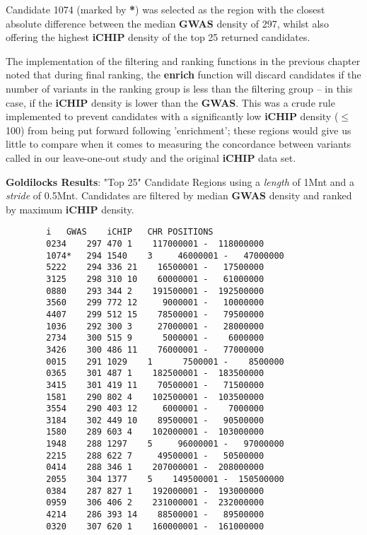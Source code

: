 Candidate 1074 (marked by \textbf{*}) was selected as the region with the
closest absolute difference between the median \textbf{GWAS} density of 297,
whilst also offering the highest \textbf{iCHIP} density of the top 25 returned
candidates.


The implementation of the filtering and ranking functions in the previous
chapter noted that during final ranking, the \textbf{enrich} function will
discard candidates if the number of variants in the ranking group is less than
the filtering group -- in this case, if the \textbf{iCHIP} density is lower than
the \textbf{GWAS}. This was a crude rule implemented to prevent candidates with
a significantly low \textbf{iCHIP} density ($\le$100) from being put forward following
'enrichment'; these regions would give us little to compare when it comes to
measuring the concordance between variants called in our leave-one-out study and
the original \textbf{iCHIP} data set.


\begin{listing}[H]
    \caption[resultsp2]{\textbf{Goldilocks Results}: "Top 25" Candidate Regions
    using a \textit{length} of 1Mnt and a \textit{stride} of 0.5Mnt. Candidates
    are filtered by median \textbf{GWAS} density and ranked by maximum
    \textbf{iCHIP} density.}
    \label{list:resultsp2}
    \begin{verbatim}
        i	GWAS	iCHIP	CHR	POSITIONS
        0234	297	470	1	 117000001 -  118000000
        1074*	294	1540	3	  46000001 -   47000000
        5222	294	336	21	  16500001 -   17500000
        3125	298	310	10	  60000001 -   61000000
        0880	293	344	2	 191500001 -  192500000
        3560	299	772	12	   9000001 -   10000000
        4407	299	512	15	  78500001 -   79500000
        1036	292	300	3	  27000001 -   28000000
        2734	300	515	9	   5000001 -    6000000
        3426	300	486	11	  76000001 -   77000000
        0015	291	1029	1	   7500001 -    8500000
        0365	301	487	1	 182500001 -  183500000
        3415	301	419	11	  70500001 -   71500000
        1581	290	802	4	 102500001 -  103500000
        3554	290	403	12	   6000001 -    7000000
        3184	302	449	10	  89500001 -   90500000
        1580	289	603	4	 102000001 -  103000000
        1948	288	1297	5	  96000001 -   97000000
        2215	288	622	7	  49500001 -   50500000
        0414	288	346	1	 207000001 -  208000000
        2055	304	1377	5	 149500001 -  150500000
        0384	287	827	1	 192000001 -  193000000
        0959	306	406	2	 231000001 -  232000000
        4214	286	393	14	  88500001 -   89500000
        0320	307	620	1	 160000001 -  161000000
    \end{verbatim}
\end{listing}

